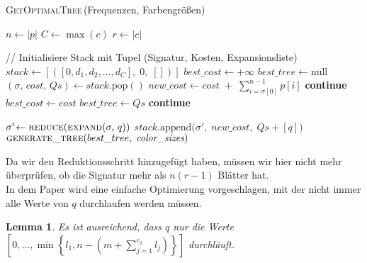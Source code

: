 \documentclass[a4paper,10pt,ngerman]{scrartcl}
\newtheorem{lemma}[satz]{Lemma}
\begin{document}
    \begin{algorithm} [H]
        \caption{\textsc{GetOptimalTree}\,(Frequenzen, Farbengrößen)}
        \begin{algorithmic}[1]
                \State $n \gets |p|$  
                \State $C \gets \max(c)$ 
                \State $r \gets |c|$  

                \State // Initialisiere Stack mit Tupel (Signatur, Kosten, Expansionsliste)
                \State $stack \gets [([0, d_1, d_2, \dots, d_C],\;0,\;[])]$
                \State $best\_cost \gets +\infty$
                \State $best\_tree \gets \text{null}$
                    \State $(\sigma,\,cost,\,Qs) \gets stack.\mathrm{pop}()$
                    \State $new\_cost \gets cost \;+\;\sum_{i=\sigma[0]}^{n-1} p[i]$
                        \State \textbf{continue}
                    \EndIf
                            \State $best\_cost \gets cost$
                            \State $best\_tree \gets Qs$
                        \EndIf
                        \State \textbf{continue}
                    \EndIf

                        \State $\sigma'\!\gets \textsc{reduce}(\textsc{expand}(\sigma,\,q))$
                        \State $stack.\mathrm{append}\bigl(\sigma',\;new\_cost,\;Qs + [q]\bigr)$
                    \EndFor
                \EndWhile
                \State \Return $\textsc{generate\_tree}(best\_tree,\;\textit{color\_sizes})$
            \EndFunction
        \end{algorithmic}\label{alg:algorithm}
    \end{algorithm}
    Da wir den Reduktionsschritt hinzugefügt haben, müssen wir hier nicht mehr überprüfen, ob die Signatur mehr als $n (r - 1)$ Blätter hat. \\
    In dem Paper\autocite{golin_dynamic_1998} wird eine einfache Optimierung vorgeschlagen, mit der nicht immer alle Werte von $q$ durchlaufen werden müssen.
    \begin{lemma}
        \label{lem:reader_1}
        Es ist ausreichend, dass $q$ nur die Werte $\left[0, \dots, \min\left\{l_1, n - \left(m + \sum^{c_2}_{j=1} l_j\right)\right\}\right]$ durchläuft.
    \end{lemma}
\end{document}
